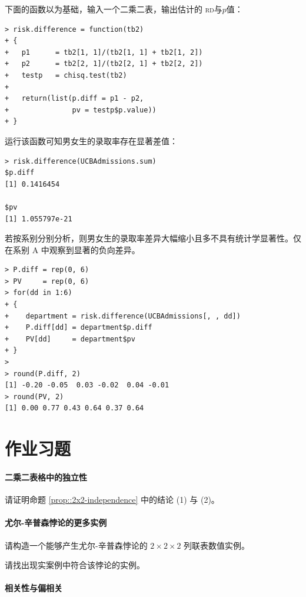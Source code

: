 下面的函数以为基础，输入一个二乘二表，输出估计的 \textsc{rd}与$p$值：
\begin{lstlisting}
> risk.difference = function(tb2)
+ {
+   p1      = tb2[1, 1]/(tb2[1, 1] + tb2[1, 2])
+   p2      = tb2[2, 1]/(tb2[2, 1] + tb2[2, 2])
+   testp   = chisq.test(tb2)
+   
+   return(list(p.diff = p1 - p2,  
+               pv = testp$p.value))	    
+ }
\end{lstlisting}
运行该函数可知男女生的录取率存在显著差值：
\begin{lstlisting}
> risk.difference(UCBAdmissions.sum)
$p.diff
[1] 0.1416454

$pv
[1] 1.055797e-21
\end{lstlisting}

若按系别分别分析，则男女生的录取率差异大幅缩小且多不具有统计学显著性。仅在系别 A 中观察到显著的负向差异。 
\begin{lstlisting}
> P.diff = rep(0, 6)
> PV     = rep(0, 6)
> for(dd in 1:6)
+ {
+ 	 department = risk.difference(UCBAdmissions[, , dd])
+ 	 P.diff[dd] = department$p.diff
+ 	 PV[dd]     = department$pv 
+ }
> 
> round(P.diff, 2)
[1] -0.20 -0.05  0.03 -0.02  0.04 -0.01
> round(PV, 2)
[1] 0.00 0.77 0.43 0.64 0.37 0.64
\end{lstlisting} 



 



 
\section{作业习题}


\paragraph{二乘二表格中的独立性}\label{hw::2x2-equivalence}

请证明命题 \ref{prop::2x2-independence} 中的结论 (1) 与 (2)。 


\paragraph{尤尔-辛普森悖论的更多实例}


请构造一个能够产生尤尔-辛普森悖论的 $2\times2\times2$ 列联表数值实例。

请找出现实案例中符合该悖论的实例。 



\paragraph{相关性与偏相关}\label{hw::partial-correlation}

